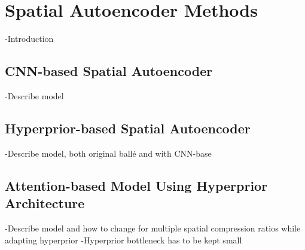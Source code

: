 \section{Spatial Autoencoder Methods\label{sec:ch3zzz}}
-Introduction
\subsection{CNN-based Spatial Autoencoder}
-Describe model

\subsection{Hyperprior-based Spatial Autoencoder}
-Describe model, both original ballé and with CNN-base

\subsection{Attention-based Model Using Hyperprior Architecture}
-Describe model and how to change for multiple spatial compression ratios while adapting hyperprior
-Hyperprior bottleneck has to be kept small
